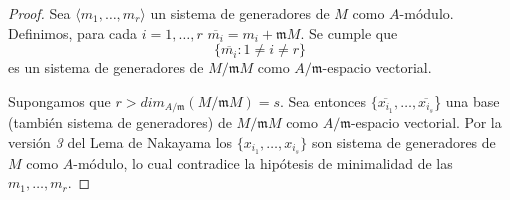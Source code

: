 \documentclass[../main.tex]{subfiles}
\begin{document}
\begin{proof}
Sea $\langle m_1,\dots,m_r\rangle$ un sistema de generadores de $M$ como $A$-módulo. Definimos, para cada $i=1,\dots,r$ $\overline{m_i}=m_i+\mathfrak{m}M$. Se cumple que $$\{\overline{m_i}:1\neq i\neq r\}$$ es un sistema de generadores de $M/\mathfrak{m}M$ como $A/\mathfrak{m}$-espacio vectorial.

Supongamos que $r>dim_{A/\mathfrak{m}}(M/\mathfrak{m}M)=s$. Sea entonces $\{\overline{x_{i_1}},\dots,\overline{x_{i_s}}$\} una base (también sistema de generadores) de $M/\mathfrak{m}M$ como $A/\mathfrak{m}$-espacio vectorial. Por la versión \textit{3} del Lema de Nakayama los $\{x_{i_1},\dots,x_{i_s}\}$ son sistema de generadores de $M$ como $A$-módulo, lo cual contradice la hipótesis de minimalidad de las $m_1,\dots,m_r$.
\end{proof}
\end{document}
